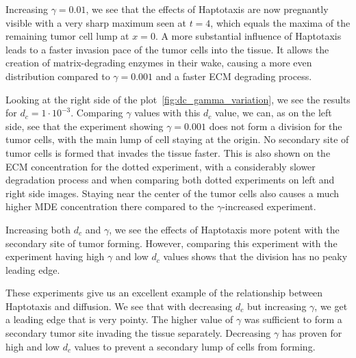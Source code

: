 Increasing $\gamma=0.01$, we see that the effects of Haptotaxis are now pregnantly visible with a very sharp maximum seen at $t=4$, which equals the maxima of the remaining tumor cell lump at $x=0$. A more substantial influence of Haptotaxis leads to a faster invasion pace of the tumor cells into the tissue. It allows the creation of matrix-degrading enzymes in their wake, causing a more even distribution compared to $\gamma=0.001$ and a faster ECM degrading process. 

Looking at the right side of the plot~\ref{fig:dc_gamma_variation}, we see the results for $d_c=1 \cdot 10^{-3}$. Comparing $\gamma$ values with this $d_c$ value, we can, as on the left side, see that the experiment showing $\gamma=0.001$ does not form a division for the tumor cells, with the main lump of cell staying at the origin. No secondary site of tumor cells is formed that invades the tissue faster. This is also shown on the ECM concentration for the dotted experiment, with a considerably slower degradation process and when comparing both dotted experiments on left and right side images. Staying near the center of the tumor cells also causes a much higher MDE concentration there compared to the $\gamma$-increased experiment. 

Increasing both $d_c$ and $\gamma$, we see the effects of Haptotaxis more potent with the secondary site of tumor forming. However, comparing this experiment with the experiment having high $\gamma$ and low $d_c$ values shows that the division has no peaky leading edge.

These experiments give us an excellent example of the relationship between Haptotaxis and diffusion. We see that with decreasing $d_c$ but increasing $\gamma$, we get a leading edge that is very pointy. The higher value of $\gamma$ was sufficient to form a secondary tumor site invading the tissue separately. Decreasing $\gamma$ has proven for high and low $d_c$ values to prevent a secondary lump of cells from forming. 

